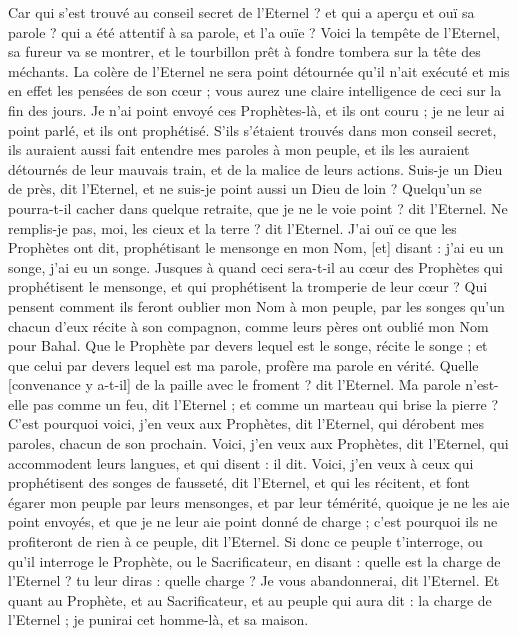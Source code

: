 \begin{multicols}{2}
Car qui s'est trouvé au conseil secret de l'Eternel ? et qui a aperçu et ouï sa parole ? qui a été attentif à sa parole, et l'a ouïe ?
Voici la tempête de l'Eternel, sa fureur va se montrer, et le tourbillon prêt à fondre tombera sur la tête des méchants.
La colère de l'Eternel ne sera point détournée qu'il n'ait exécuté et mis en effet les pensées de son cœur ; vous aurez une claire intelligence de ceci sur la fin des jours.
Je n'ai point envoyé ces Prophètes-là, et ils ont couru ; je ne leur ai point parlé, et ils ont prophétisé.
S'ils s'étaient trouvés dans mon conseil secret, ils auraient aussi fait entendre mes paroles à mon peuple, et ils les auraient détournés de leur mauvais train, et de la malice de leurs actions.
Suis-je un Dieu de près, dit l'Eternel, et ne suis-je point aussi un Dieu de loin ?
Quelqu'un se pourra-t-il cacher dans quelque retraite, que je ne le voie point ? dit l'Eternel. Ne remplis-je pas, moi, les cieux et la terre ? dit l'Eternel.
J'ai ouï ce que les Prophètes ont dit, prophétisant le mensonge en mon Nom, [et] disant : j'ai eu un songe, j'ai eu un songe.
Jusques à quand ceci sera-t-il au cœur des Prophètes qui prophétisent le mensonge, et qui prophétisent la tromperie de leur cœur ?
Qui pensent comment ils feront oublier mon Nom à mon peuple, par les songes qu'un chacun d'eux récite à son compagnon, comme leurs pères ont oublié mon Nom pour Bahal.
Que le Prophète par devers lequel est le songe, récite le songe ; et que celui par devers lequel est ma parole, profère ma parole en vérité. Quelle [convenance y a-t-il] de la paille avec le froment ? dit l'Eternel.
Ma parole n'est-elle pas comme un feu, dit l'Eternel ; et comme un marteau qui brise la pierre ?
C'est pourquoi voici, j'en veux aux Prophètes, dit l'Eternel, qui dérobent mes paroles, chacun de son prochain.
Voici, j'en veux aux Prophètes, dit l'Eternel, qui accommodent leurs langues, et qui disent : il dit.
Voici, j'en veux à ceux qui prophétisent des songes de fausseté, dit l'Eternel, et qui les récitent, et font égarer mon peuple par leurs mensonges, et par leur témérité, quoique je ne les aie point envoyés, et que je ne leur aie point donné de charge ; c'est pourquoi ils ne profiteront de rien à ce peuple, dit l'Eternel.
Si donc ce peuple t'interroge, ou qu'il interroge le Prophète, ou le Sacrificateur, en disant : quelle est la charge de l'Eternel ? tu leur diras : quelle charge ? Je vous abandonnerai, dit l'Eternel.
Et quant au Prophète, et au Sacrificateur, et au peuple qui aura dit : la charge de l'Eternel ; je punirai cet homme-là, et sa maison.

\end{multicols}
